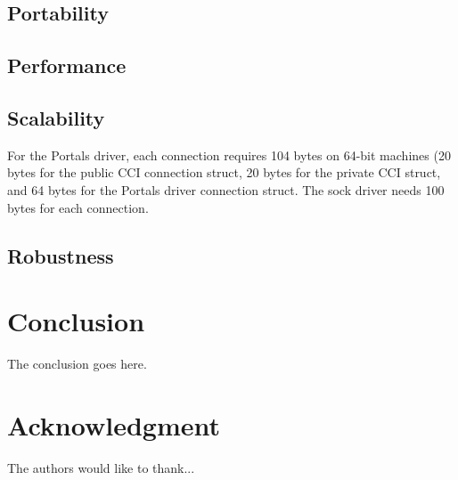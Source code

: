 \documentclass[conference]{IEEEtran}
\begin{document}
\subsection{Portability}

\subsection{Performance}

\subsection{Scalability}

For the Portals driver, each connection requires 104 bytes on 64-bit machines
(20 bytes for the public CCI connection struct, 20 bytes for the private CCI
struct, and 64 bytes for the Portals driver connection struct.  The sock driver
needs 100 bytes for each connection.

\subsection{Robustness}



\section{Conclusion}
The conclusion goes here.


\section*{Acknowledgment}

The authors would like to thank...



\end{document}
